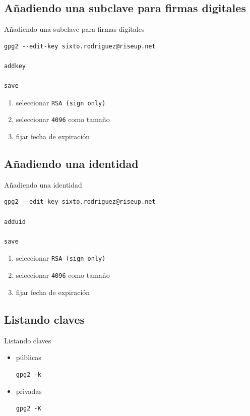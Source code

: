 \documentclass{beamer}
\begin{document}
\subsection{Añadiendo una subclave para firmas digitales}
\begin{frame}[fragile]{Añadiendo una subclave para firmas digitales}
\begin{lstlisting}
gpg2 --edit-key sixto.rodriguez@riseup.net

addkey

save
\end{lstlisting}
\begin{enumerate}
    \item seleccionar \texttt{RSA (sign only)}
    \item seleccionar \texttt{4096} como tamaño
    \item fijar fecha de expiración
\end{enumerate}
\end{frame}


\subsection{Añadiendo una identidad}
\begin{frame}[fragile]{Añadiendo una identidad}
\begin{lstlisting}
gpg2 --edit-key sixto.rodriguez@riseup.net

adduid

save
\end{lstlisting}
\begin{enumerate}
    \item seleccionar \texttt{RSA (sign only)}
    \item seleccionar \texttt{4096} como tamaño
    \item fijar fecha de expiración
\end{enumerate}
\end{frame}


\subsection{Listando claves}
\begin{frame}[fragile]{Listando claves}
\begin{itemize}
    \item públicas
        \begin{lstlisting}
gpg2 -k
        \end{lstlisting}
    \item privadas
        \begin{lstlisting}
gpg2 -K
        \end{lstlisting}
\end{itemize}
\end{frame}
\end{document}
